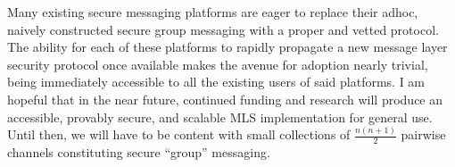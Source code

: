 \documentclass[12pt,twocolumn]{article}
\begin{document}
	Many existing secure messaging platforms are eager to replace their adhoc, naively constructed secure group messaging with a proper and vetted protocol.
	The ability for each of these platforms to rapidly propagate a new message layer security protocol once available makes the avenue for adoption nearly trivial, being immediately accessible to all the existing users of said platforms. 
	I am hopeful that in the near future, continued funding and research will produce an accessible, provably secure, and scalable MLS implementation for general use.
	Until then, we will have to be content with small collections of $\frac{n(n+1)}{2}$ pairwise channels constituting secure ``group'' messaging.
	
	
	
	\onecolumn
	
	
\end{document}
